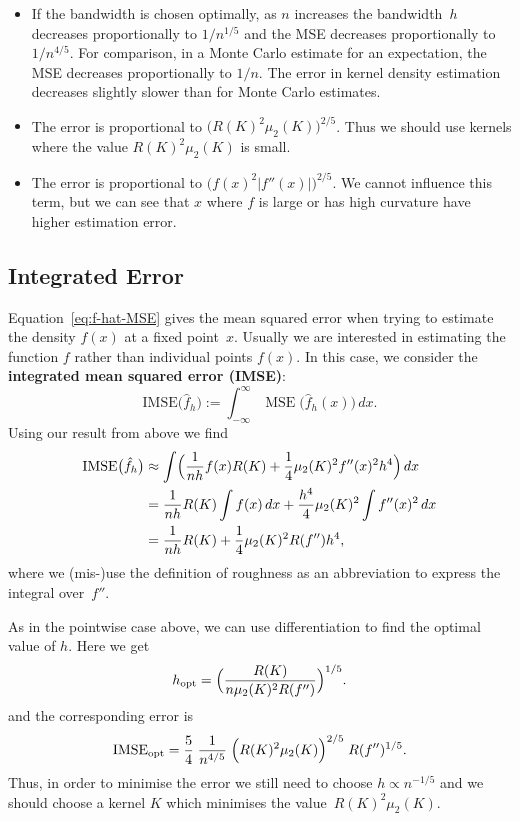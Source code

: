 \documentclass[
  a4paper,
]{article}
\theoremstyle{definition}
\theoremstyle{definition}
\theoremstyle{definition}
\theoremstyle{definition}
\theoremstyle{remark}
\begin{document}
\begin{itemize}
\item
  If the bandwidth is chosen optimally, as \(n\) increases the bandwidth~\(h\)
  decreases proportionally to \(1/n^{1/5}\) and the MSE decreases
  proportionally to \(1 / n^{4/5}\). For comparison, in a Monte Carlo
  estimate for an expectation, the MSE decreases proportionally to \(1/n\).
  The error in kernel density estimation decreases slightly slower than
  for Monte Carlo estimates.
\item
  The error is proportional to \(\bigl( R(K)^2 \mu_2(K) \bigr)^{2/5}\).
  Thus we should use kernels where the value \(R(K)^2 \mu_2(K)\)
  is small.
\item
  The error is proportional to \(\bigl( f(x)^2 |f''(x)| \bigr)^{2/5}\).
  We cannot influence this term, but we can see that \(x\) where \(f\) is large
  or has high curvature have higher estimation error.
\end{itemize}

\subsection{Integrated Error}\label{IMSE}

Equation~\eqref{eq:f-hat-MSE} gives the mean squared error when trying to estimate the density
\(f(x)\) at a fixed point~\(x\). Usually we are interested in estimating
the function \(f\) rather than individual points \(f(x)\). In this case,
we consider the \textbf{integrated mean squared error (IMSE)}:
\begin{equation*}
  \mathrm{IMSE}\bigl( \hat f_h \bigr)
  := \int_{-\infty}^\infty \mathop{\mathrm{MSE}}\nolimits\bigl( \hat f_h(x) \bigr) \,dx.
\end{equation*}
Using our result from above we find
\begin{align*}
  \mathrm{IMSE}\bigl( \hat f_h \bigr)
  &\approx \int \Bigl( \frac{1}{nh} f(x) R(K) + \frac14 \mu_2(K)^2 f''(x)^2 h^4 \Bigr) \,dx \\
  &= \frac{1}{nh} R(K) \int f(x) \,dx + \frac{h^4}{4} \mu_2(K)^2 \int f''(x)^2 \,dx \\
  &= \frac{1}{nh} R(K) + \frac{1}{4} \mu_2(K)^2 R(f'') h^4,
\end{align*}
where we (mis-)use the definition of roughness as an abbreviation to express
the integral over~\(f''\).

As in the pointwise case above, we can use differentiation to find the optimal value of \(h\).
Here we get
\begin{equation*}
  h_\mathrm{opt}
  = \Bigl( \frac{R(K)}{n \mu_2(K)^2 R(f'')} \Bigr)^{1/5}.
\end{equation*}
and the corresponding error is
\begin{equation}
  \mathrm{IMSE}_\mathrm{opt}
  = \frac54 \; \frac{1}{n^{4/5}}
      \; \Bigl( R(K)^2 \mu_2(K) \Bigr)^{2/5}
      \; R(f'')^{1/5}.  \label{eq:IMSE-opt}
\end{equation}
Thus, in order to minimise the error we still need to choose
\(h \propto n^{-1/5}\) and we should choose a kernel \(K\) which minimises
the value~\(R(K)^2 \mu_2(K)\).
\end{document}
